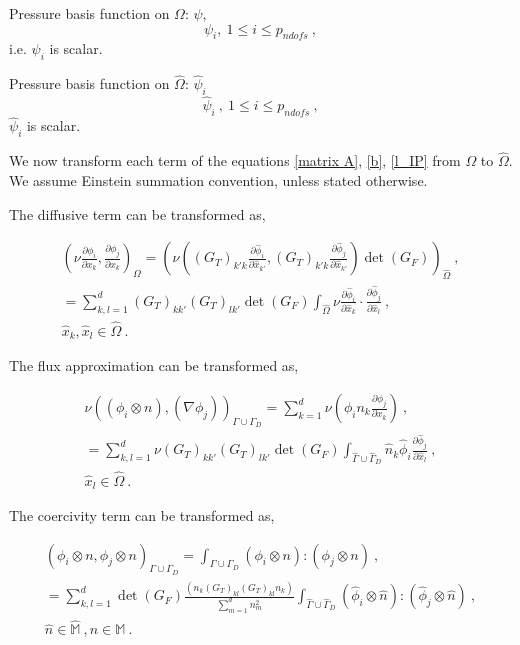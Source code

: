 \documentclass[a4paper,oneside,openright,spanish,english]{book}
\begin{document}
Pressure basis function on $\Omega$: $\psi$,
\begin{equation}
\psi_i, \  1 \leq i \leq p_{ndofs} \ ,
\end{equation}
i.e. $\psi_i$ is scalar.

Pressure basis function on $\hat{\Omega}$: $\hat{\psi}_i$  
\begin{equation}
\hat{\psi}_i \ , \ 1 \leq i \leq p_{ndofs} \ ,
\end{equation}
$\hat{\psi}_i$ is scalar.

We now transform each term of the equations \eqref{matrix A}, \eqref{b}, \eqref{l_IP} from $\Omega$ to $\hat{\Omega}$. We assume Einstein summation convention, unless stated otherwise.

The diffusive term can be transformed as,

\begin{equation}\label{affine_diffusive_term}
\begin{split}
(\nu \frac{\partial \phi_i}{\partial x_k} , \frac{\partial \phi_j}{\partial x_k})_{\Omega} = (\nu ((G_T)_{k'k}\frac{\partial \hat{\phi}_i}{\partial \hat{x}_{k'}}, (G_T)_{k'k}\frac{\partial \hat{\phi}_j}{\partial \hat{x}_{k'}})\det(G_F))_{\hat{\Omega}} \ , \\
= \sum_{k,l=1}^{d} (G_T)_{kk'} (G_T)_{lk'} \det(G_F) \int_{\hat{\Omega}} \nu \frac{\partial \hat{\phi}_i}{\partial \hat{x}_k} \cdot \frac{\partial \hat{\phi}_j}{\partial \hat{x}_l} \ , \\
\hat{x}_k, \hat{x}_l \in \hat{\Omega} \ .
\end{split}
\end{equation}

The flux approximation can be transformed as,

\begin{equation}\label{affine_flux_term}
\begin{split}
\nu ((\phi_i \otimes n),(\nabla \phi_j))_{\Gamma \cup \Gamma_D} = \sum_{k=1}^d \nu (\phi_i n_k \frac{\partial \phi_j}{\partial x_k})\ , \\
= \sum_{k,l=1}^{d} \nu (G_T)_{kk'} (G_T)_{lk'} \det(G_F) \int_{\hat{\Gamma} \cup \hat{\Gamma}_D} \hat{n}_k \hat{\phi}_i \frac{\partial \hat{\phi}_j}{\partial \hat{x}_l} \ , \\
\hat{x}_l \in \hat{\Omega} \ .
\end{split}
\end{equation}

The coercivity term can be transformed as,

\begin{equation}\label{affine_coercivity_term}
\begin{split}
(\phi_i \otimes n,\phi_j \otimes n)_{\Gamma \cup \Gamma_D} = \int_{\Gamma \cup \Gamma_D} (\phi_i \otimes n) : (\phi_j \otimes n) \ , \\
= \sum_{k,l=1}^{d} \det(G_F) \frac{(n_k (G_T)_{kl} (G_T)_{kl} n_k)}{\sum_{m=1}^{d} n_m^2 } \int_{\hat{\Gamma} \cup \hat{\Gamma}_D} (\hat{\phi}_i \otimes \hat{n}) : (\hat{\phi}_j \otimes \hat{n}) \ , \\
\hat{n} \in \hat{\mathbb{M}} \ , n \in \mathbb{M} \ .
\end{split}
\end{equation}
\end{document}
